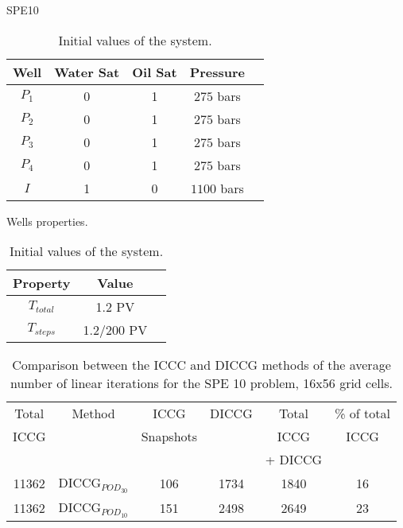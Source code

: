 \documentclass[12pt]{article}
\begin{document}
\newpage
SPE10 \\
\begin{table}[!ht]
\hspace{-0cm}
\begin{minipage}{.5\textwidth}
\centering
\begin{tabular}{ |c|c|c|c|c|} 
\hline
Well&Water Sat&Oil Sat&Pressure\\
\hline
$P_1$&     0&    1 & $275$ bars \\  
$P_2$& 0& 1& $275$ bars\\
$P_3$&     0&    1 & $275$ bars \\  
$P_4$& 0& 1& $275$ bars\\
$I$&     1&    0 & $1100$ bars\\  
\hline
\end{tabular}
\caption{Wells properties.}\label{table:wells1}
\end{minipage}%
\begin{minipage}{.4\textwidth}
\centering
\begin{tabular}{ |c|c|c|} 
\hline
Property&Value\\
\hline
    $T_{total}$&     1.2 PV\\
$T_{steps}$& 1.2/200 PV\\
\hline
\end{tabular}\caption{Initial values of the system.}
\label{table:icw}
\end{minipage}
\hspace{1cm} 
\end{table} 


\begin{table}[!ht]\centering
\begin{minipage}{1\textwidth}
 \centering
\begin{tabular}{ ||c||c|c|c|c|c||} 
\hline
Total&Method  & ICCG&DICCG &Total&\% of total\\ 
                            ICCG     &  & Snapshots& &ICCG& ICCG\\ 
                              &  & & &+ DICCG& \\   
                              \hline
11362& DICCG$_{POD_{30}}$&106&1734&1840&16 \\ 
\hline  
11362& DICCG$_{POD_{10}}$&151&2498&2649&23 \\ 
\hline  
\end{tabular} 
\caption{Comparison between the ICCC and DICCG methods of the average number of linear iterations for the SPE 10 problem, 16x56 grid cells. }\label{table:litertot2} 
\end{minipage}  
\end{table}  
\end{document}
